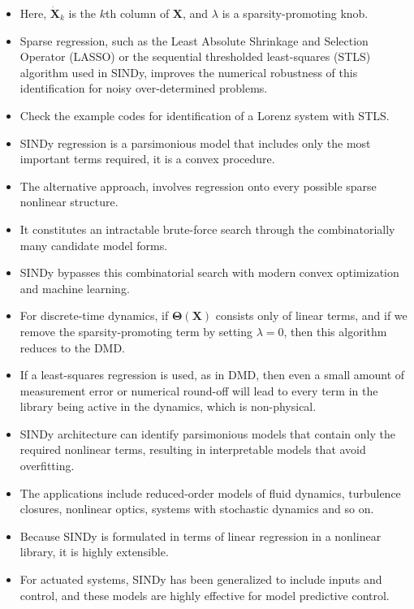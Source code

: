 \documentclass[hyperref={pdfpagemode=FullScreen},aspectratio=169]{beamer}
\begin{document}
\begin{frame}{}
\begin{itemize}
\setlength\itemsep{1em}
\item Here, $\dot{\mathbf{X}}_k$ is the $k$th column of $\mathbf{X}$, and $\lambda$ is a sparsity-promoting knob.
\item Sparse regression, such as the Least Absolute Shrinkage and Selection Operator (LASSO) or the sequential thresholded least-squares (STLS) algorithm used in SINDy, improves the numerical robustness of this identification for noisy over-determined problems.
\item Check the example codes for identification of a Lorenz system with STLS.
\item SINDy regression is a parsimonious model that includes only the most important terms required, it is a convex procedure.
\item The alternative approach, involves regression onto every possible sparse nonlinear
structure.
\item It constitutes an intractable brute-force search through the combinatorially many candidate model forms. 
\item SINDy bypasses this combinatorial search with modern convex optimization and machine learning.
\end{itemize}
\end{frame}
\begin{frame}{}
\begin{itemize}
\setlength\itemsep{1em}
\item For discrete-time dynamics, if $\mathbf{\Theta}(\mathbf{X})$ consists only of linear terms, and if we remove the sparsity-promoting term by setting $\lambda = 0$, then this algorithm reduces to the DMD.
\item If a least-squares regression is used, as in DMD, then even a small amount of measurement error or numerical round-off will lead to every term in the library being active in the dynamics, which is non-physical.
\item SINDy architecture can identify parsimonious models that contain only the required nonlinear terms, resulting in interpretable models that avoid overfitting.
\item The applications include reduced-order models of fluid dynamics, turbulence closures, nonlinear optics, systems with stochastic dynamics and so on. 
\item Because SINDy is formulated in terms of linear regression in a nonlinear library, it is
highly extensible. 
\item For actuated systems, SINDy has been generalized to include inputs and control, and these models are highly effective for model predictive control.
\end{itemize}
\end{frame}
\end{document}
